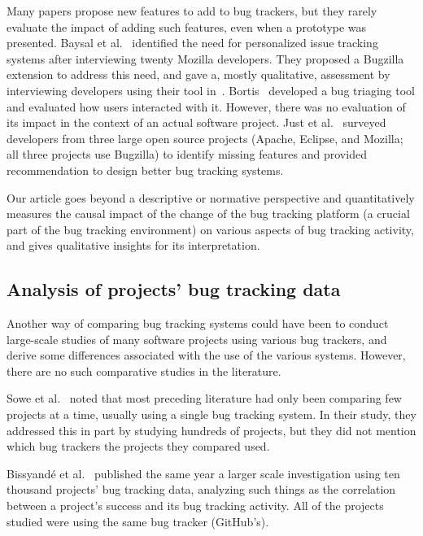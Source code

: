 \documentclass[conference]{IEEEtran}
\begin{document}
Many papers propose new features to add to bug trackers, but they rarely evaluate the impact of adding such features, even when a prototype was presented.
Baysal et al.~\cite{baysal2013situational} identified the need for personalized issue tracking systems after interviewing twenty Mozilla developers. They proposed a Bugzilla extension to address this need, and gave a, mostly qualitative, assessment by interviewing developers using their tool in~\cite{baysal2014no}.
Bortis~\cite{bortis2016porchlight} developed a bug triaging tool and evaluated how users interacted with it. However, there was no evaluation of its impact in the context of an actual software project.
Just et al.~\cite{just2008towards} surveyed developers from three large open source projects (Apache, Eclipse, and Mozilla; all three projects use Bugzilla) to identify missing features and provided recommendation to design better bug tracking systems.

Our article goes beyond a descriptive or normative perspective and quantitatively measures the causal impact of the change of the bug tracking platform (a crucial part of the bug tracking environment) on various aspects of bug tracking activity, and gives qualitative insights for its interpretation.

\subsection{Analysis of projects' bug tracking data}

Another way of comparing bug tracking systems could have been to conduct large-scale studies of many software projects using various bug trackers, and derive some differences associated with the use of the various systems. However, there are no such comparative studies in the literature.

Sowe et al.~\cite{sowe2013multi} noted that most preceding literature had only been comparing few projects at a time, usually using a single bug tracking system. In their study, they addressed this in part by studying hundreds of projects, but they did not mention which bug trackers the projects they compared used.

Bissyand\'e et al.~\cite{bissyande2013got} published the same year a larger scale investigation using ten thousand projects' bug tracking data, analyzing such things as the correlation between a project's success and its bug tracking activity. All of the projects studied were using the same bug tracker (GitHub's).
\end{document}
